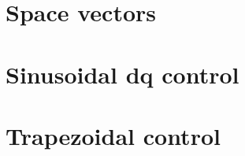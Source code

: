\documentclass[a4paper,11pt,oneside,fleqn,titlepage]{report}
\begin{document}
\section{Space vectors}


\section{Sinusoidal dq control}


\section{Trapezoidal control}
\end{document}
